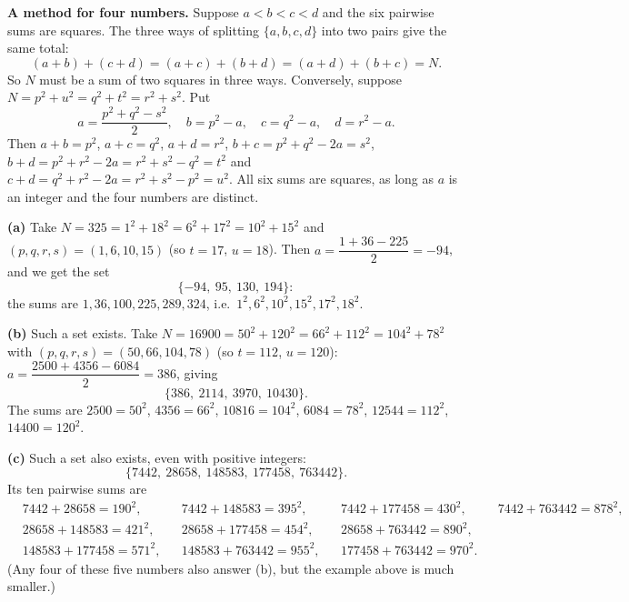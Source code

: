 \textbf{A method for four numbers.} Suppose $a<b<c<d$ and the six pairwise sums are squares. The three ways of splitting $\{a,b,c,d\}$ into two pairs give the same total:
\[
(a+b)+(c+d)=(a+c)+(b+d)=(a+d)+(b+c)=N .
\]
So $N$ must be a sum of two squares in three ways. Conversely, suppose $N=p^2+u^2=q^2+t^2=r^2+s^2$. Put
\[
a=\dfrac{p^2+q^2-s^2}{2},\quad b=p^2-a,\quad c=q^2-a,\quad d=r^2-a .
\]
Then $a+b=p^2$, $a+c=q^2$, $a+d=r^2$, $b+c=p^2+q^2-2a=s^2$, $b+d=p^2+r^2-2a=r^2+s^2-q^2=t^2$ and $c+d=q^2+r^2-2a=r^2+s^2-p^2=u^2$. All six sums are squares, as long as $a$ is an integer and the four numbers are distinct.

\textbf{(a)} Take $N=325=1^2+18^2=6^2+17^2=10^2+15^2$ and $(p,q,r,s)=(1,6,10,15)$ (so $t=17$, $u=18$). Then $a=\dfrac{1+36-225}{2}=-94$, and we get the set
\[
\boxed{\{-94,\ 95,\ 130,\ 194\}}:
\]
the sums are $1,36,100,225,289,324$, i.e.\ $1^2,6^2,10^2,15^2,17^2,18^2$.

\textbf{(b)} Such a set exists. Take $N=16900=50^2+120^2=66^2+112^2=104^2+78^2$ with $(p,q,r,s)=(50,66,104,78)$ (so $t=112$, $u=120$): $a=\dfrac{2500+4356-6084}{2}=386$, giving
\[
\boxed{\{386,\ 2114,\ 3970,\ 10430\}}.
\]
The sums are $2500=50^2$, $4356=66^2$, $10816=104^2$, $6084=78^2$, $12544=112^2$, $14400=120^2$.

\textbf{(c)} Such a set also exists, even with positive integers:
\[
\boxed{\{7442,\ 28658,\ 148583,\ 177458,\ 763442\}}.
\]
Its ten pairwise sums are
\[
\begin{aligned}
&7442+28658=190^2, && 7442+148583=395^2, && 7442+177458=430^2, && 7442+763442=878^2,\\
&28658+148583=421^2, && 28658+177458=454^2, && 28658+763442=890^2, &&\\
&148583+177458=571^2, && 148583+763442=955^2, && 177458+763442=970^2 . &&
\end{aligned}
\]
(Any four of these five numbers also answer (b), but the example above is much smaller.)
